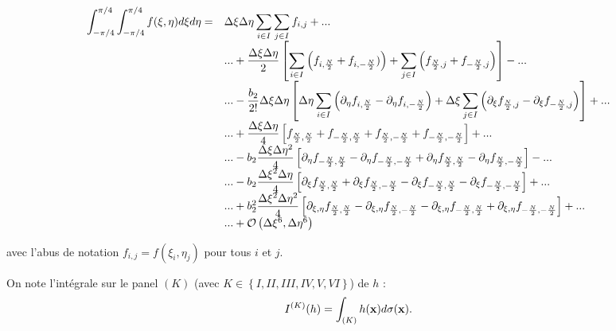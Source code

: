 \begin{equation}
\begin{array}{rl}
\displaystyle\int_{-\pi/4}^{\pi/4} \displaystyle\int_{-\pi/4}^{\pi/4} f(\xi,\eta)d\xi d\eta = & \Delta \xi \Delta \eta \displaystyle\sum\limits_{i \in I} \displaystyle\sum\limits_{j \in I} f_{i,j} + ... \\
 & ... + \dfrac{\Delta \xi \Delta \eta}{2} \left[ \displaystyle\sum\limits_{i \in I} \left(  f_{i,\frac{N}{2}} + f_{i,-\frac{N}{2}})  \right) + \displaystyle\sum\limits_{j \in I} \left(  f_{\frac{N}{2},j} + f_{-\frac{N}{2},j}  \right) \right] - ... \\
 &  ... - \dfrac{b_2}{2!} \Delta \xi \Delta \eta \left[ \Delta \eta \displaystyle\sum\limits_{i \in I} \left(  \partial_{\eta }f_{i,\frac{N}{2}} -  \partial_{\eta }f_{i,-\frac{N}{2}}  \right) + \Delta \xi \displaystyle\sum\limits_{j \in I} \left(   \partial_{\xi }f_{\frac{N}{2},j} - \partial_{\xi }f_{-\frac{N}{2},j}  \right) \right] + ... \\
 & ... + \dfrac{\Delta \xi \Delta \eta}{4} \left[ f_{\frac{N}{2},\frac{N}{2}}+f_{-\frac{N}{2},\frac{N}{2}}+f_{\frac{N}{2},-\frac{N}{2}}+f_{-\frac{N}{2},-\frac{N}{2}} \right] + ... \\
 & ... - b_2 \dfrac{\Delta \xi \Delta \eta^2}{4} \left[ \partial_{\eta} f_{-\frac{N}{2},\frac{N}{2}} - \partial_{\eta} f_{-\frac{N}{2},-\frac{N}{2}} + \partial_{\eta} f_{\frac{N}{2},\frac{N}{2}} -\partial_{\eta} f_{\frac{N}{2},-\frac{N}{2}}  \right] - ... \\
  & ... - b_2 \dfrac{\Delta \xi^2 \Delta \eta}{4} \left[ \partial_{\xi} f_{\frac{N}{2},\frac{N}{2}} + \partial_{\xi} f_{\frac{N}{2},-\frac{N}{2}} - \partial_{\xi} f_{-\frac{N}{2},\frac{N}{2}} -\partial_{\xi} f_{-\frac{N}{2},-\frac{N}{2}}  \right] + ... \\
  & ... + b_2^2 \dfrac{\Delta \xi^2 \Delta \eta^2}{4} \left[ \partial_{\xi,\eta} f_{\frac{N}{2},\frac{N}{2}} - \partial_{\xi,\eta} f_{\frac{N}{2},-\frac{N}{2}} - \partial_{\xi,\eta} f_{-\frac{N}{2},\frac{N}{2}} + \partial_{\xi,\eta} f_{-\frac{N}{2},-\frac{N}{2}} \right] + ... \\
  & ... + \mathcal{O} \left( \Delta \xi^6, \Delta \eta^6 \right)
  \end{array}
\label{eq:euler maclaurin 2d composite}
\end{equation}

avec l'abus de notation $f_{i,j} = f(\xi_i, \eta_j)$ pour tous $i$ et $j$.

On note l'intégrale sur le panel $(K)$ (avec $K \in \left\lbrace I, II, III, IV, V, VI \right\rbrace$) de $h$ :
$$I^{(K)}(h) = \displaystyle\int_{(K)} h(\mathbf{x}) d \sigma (\mathbf{x}).$$

